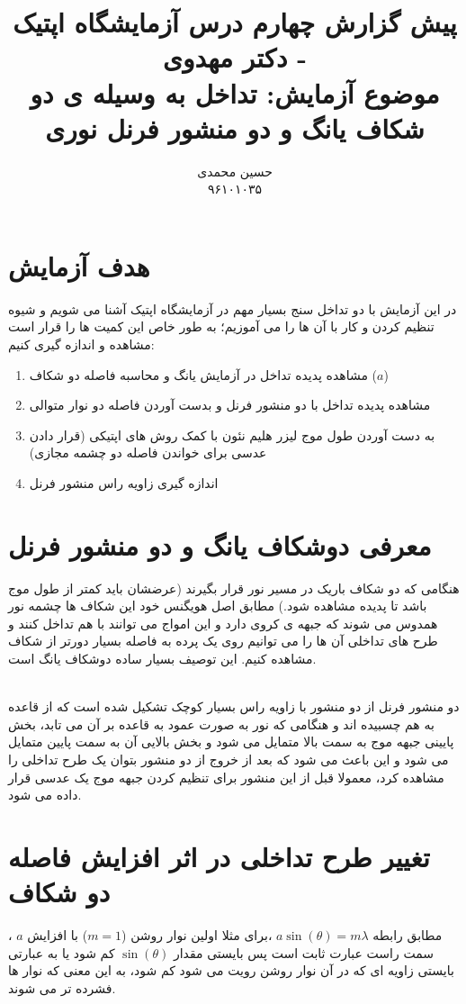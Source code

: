 \documentclass{article}
\title{	
	پیش گزارش چهارم درس آزمایشگاه اپتیک - دکتر مهدوی
	\\
	\small
	موضوع آزمايش: تداخل به وسیله ی دو شکاف يانگ و دو منشور فرنل
	نوری
}
\author{
حسین محمدی 
\\
۹۶۱۰۱۰۳۵
}
\begin{document}
\maketitle
\section{هدف آزمایش}
	در این آزمایش با دو تداخل سنج بسیار مهم در آزمایشگاه اپتیک آشنا می شویم و شیوه تنظیم کردن و کار با آن ها را می آموزیم؛ به طور خاص این کمیت ها را قرار است مشاهده و اندازه گیری کنیم:
\begin{enumerate}
	\item مشاهده پدیده تداخل در آزمایش یانگ و محاسبه فاصله دو شکاف 
	($a$)
	\item مشاهده پدیده تداخل با دو منشور فرنل و بدست آوردن فاصله دو نوار متوالی
	\item به دست آوردن طول موج لیزر هلیم نئون با کمک روش های اپتیکی (قرار دادن عدسی برای خواندن فاصله دو چشمه مجازی)
	\item اندازه گیری زاویه راس منشور فرنل
\end{enumerate}
\section{معرفی دوشکاف یانگ و دو منشور فرنل}
هنگامی که دو شکاف باریک در مسیر نور قرار بگیرند (عرضشان باید کمتر از طول موج باشد تا پدیده مشاهده شود.) مطابق اصل هویگنس خود این شکاف ها چشمه نور همدوس می شوند که جبهه ی کروی دارد و این امواج می توانند با هم تداخل کنند و  طرح های تداخلی آن ها را می توانیم روی یک پرده به فاصله بسیار دورتر از شکاف مشاهده کنیم. این توصیف بسیار ساده دوشکاف یانگ است.

\noindent\\
دو منشور فرنل از دو منشور با زاویه راس بسیار کوچک تشکیل شده است که از قاعده به هم چسبیده اند و هنگامی که نور به صورت عمود به قاعده بر آن می تابد، بخش پایینی جبهه موج به سمت بالا متمایل می شود و بخش بالایی آن به سمت پایین متمایل می شود و این باعث می شود که بعد از خروج از دو منشور بتوان یک طرح تداخلی را مشاهده کرد، معمولا قبل از این منشور برای تنظیم کردن جبهه موج یک عدسی قرار داده می شود.
\section{تغییر طرح تداخلی در اثر افزایش فاصله دو شکاف}
مطابق رابطه 
$a \sin (\theta) = m \lambda$
،برای مثلا اولین نوار روشن
($m=1$)
 با افزایش 
$a$ ، 
سمت راست عبارت ثابت است پس بایستی مقدار 
$ \sin (\theta)$
کم شود یا به عبارتی بایستی زاویه ای که در آن نوار روشن رویت می شود کم شود، به این معنی که نوار ها فشرده تر می شوند.
\end{document}
